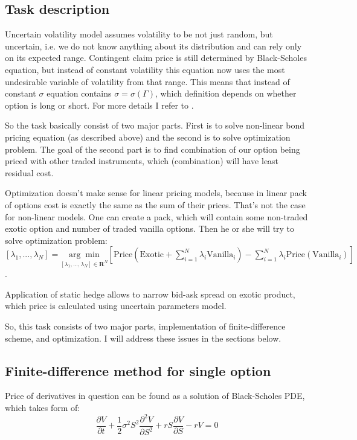 \documentclass[11pt]{article} %
\begin{document}
\subsection{Task description}
Uncertain volatility model assumes volatility to be not just random, but uncertain, i.e. we do not know anything about its distribution and can rely only on its expected range. Contingent claim price is still determined by Black-Scholes equation, but instead of constant volatility this equation now uses the most undesirable variable of volatility from that range. This means that instead of constant $\sigma$ equation contains $\sigma = \sigma(\Gamma)$, which definition depends on whether option is long or short. For more details I refer to \cite[ch. 52 and 60]{PWoQF06}.

So the task basically consist of two major parts. First is to solve non-linear bond pricing equation (as described above) and the second is to solve optimization problem. The goal of the second part is to find combination of our option being priced with other traded instruments, which (combination) will have least residual cost. 

Optimization doesn't make sense for linear pricing models, because in linear pack of options cost is exactly the same as the sum of their prices. That's not the case for non-linear models. One can create a pack, which will contain some non-traded exotic option and number of traded vanilla options. Then he or she will try to solve optimization problem: $[\lambda_1, ..., \lambda_N] = \underset{[\lambda_1, ..., \lambda_N]\in \mathbf{R}^N}{\arg \min} \left[\text{Price}\left(\text{Exotic} + \sum_{i=1}^{N}\lambda_i \text{Vanilla}_i\right) - \sum_{i=1}^N\lambda_i\text{Price}\left(\text{Vanilla}_i\right) \right]$.

Application of static hedge allows to narrow bid-ask spread on exotic product, which price is calculated using uncertain parameters model.

So, this task consists of two major parts, implementation of finite-difference scheme, and optimization. I will address these issues in the sections below.

\subsection{Finite-difference method for single option}
Price of derivatives in question can be found as a solution of Black-Scholes PDE, which takes form of:
\begin{equation}
\frac{\partial V}{\partial t} + \frac{1}{2}\sigma^2 S^2 \frac{\partial^2 V}{\partial S^2} +rS\frac{\partial V}{\partial S} - rV = 0
\end{equation}
\end{document}
